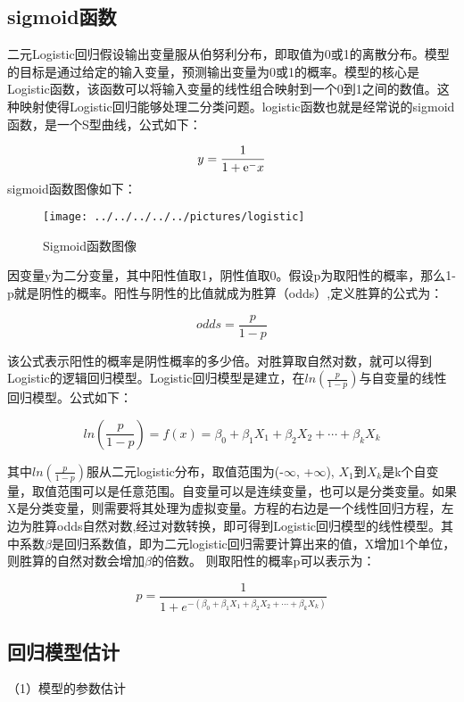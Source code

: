 \subsection{sigmoid函数}
二元Logistic回归假设输出变量服从伯努利分布，即取值为0或1的离散分布。模型的目标是通过给定的输入变量，预测输出变量为0或1的概率。模型的核心是Logistic函数，该函数可以将输入变量的线性组合映射到一个0到1之间的数值。这种映射使得Logistic回归能够处理二分类问题。logistic函数也就是经常说的sigmoid函数，是一个S型曲线，公式如下：

\begin{equation}
	y = \frac{1}{1+\mathrm{e}^-x} 
\end{equation}
sigmoid函数图像如下：

\begin{figure}[!h]
	\centering
	\texttt{[image: ../../../../../pictures/logistic]}
	 \caption{Sigmoid函数图像}
\end{figure}

因变量y为二分变量，其中阳性值取1，阴性值取0。假设p为取阳性的概率，那么1-p就是阴性的概率。阳性与阴性的比值就成为胜算（odds）,定义胜算的公式为：

\begin{equation}
	odds = \frac{p}{1-p} 
\end{equation}


该公式表示阳性的概率是阴性概率的多少倍。对胜算取自然对数，就可以得到Logistic的逻辑回归模型。Logistic回归模型是建立，在$ln(\frac{p}{1-p})$与自变量的线性回归模型。公式如下：

\begin{equation}
	ln(\frac{p}{1-p}) = f(x) = \beta_0+\beta_1X_1+\beta_2X_2+\cdots+\beta_kX_k
\end{equation}

其中$ln(\frac{p}{1-p})$服从二元logistic分布，取值范围为(-$\infty$, +$\infty$), $X_1$到$X_k$是k个自变量，取值范围可以是任意范围。自变量可以是连续变量，也可以是分类变量。如果X是分类变量，则需要将其处理为虚拟变量。方程的右边是一个线性回归方程，左边为胜算odds自然对数,经过对数转换，即可得到Logistic回归模型的线性模型。其中系数$\beta$是回归系数值，即为二元logistic回归需要计算出来的值，X增加1个单位，则胜算的自然对数会增加$\beta$的倍数。
则取阳性的概率p可以表示为：

\begin{equation}
	p= \frac{1}{1+e^{-(\beta_0+\beta_1X_1+\beta_2X_2+\cdots+\beta_kX_k)}}
\end{equation}

\subsection{回归模型估计}
（1）模型的参数估计

